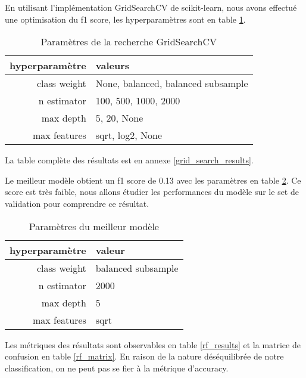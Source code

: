En utilisant l'implémentation GridSearchCV de scikit-learn, nous avons effectué une optimisation du f1 score, les hyperparamètres sont en table \ref{grid_params}.

\begin{table}[H]
  \begin{center}
    \caption{\label{grid_params}Paramètres de la recherche GridSearchCV}
    \begin{tabular}{r|l}
      hyperparamètre & valeurs                            \\ \hline
      class weight   & None, balanced, balanced subsample \\
      n estimator    & 100, 500, 1000, 2000               \\
      max depth      & 5, 20, None                        \\
      max features   & sqrt, log2, None                   \\
    \end{tabular}
  \end{center}
\end{table}

La table complète des résultats est en annexe \ref{grid_search_results}.

Le meilleur modèle obtient un f1 score de 0.13 avec les paramètres en table \ref{rf_params}.
Ce score est très faible, nous allons étudier les performances du modèle sur le set de validation pour comprendre ce résultat.

\begin{table}[H]
  \begin{center}
    \caption{\label{rf_params}Paramètres du meilleur modèle}
    \begin{tabular}{r|l}
      hyperparamètre & valeur             \\ \hline
      class weight   & balanced subsample \\
      n estimator    & 2000               \\
      max depth      & 5                  \\
      max features   & sqrt               \\
    \end{tabular}
  \end{center}
\end{table}

Les métriques des résultats sont observables en table \ref{rf_results} et la matrice de confusion en table \ref{rf_matrix}.
En raison de la nature déséquilibrée de notre classification, on ne peut pas se fier à la métrique d'accuracy.


